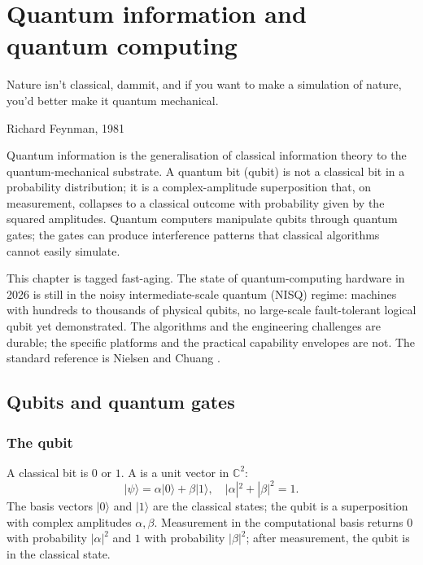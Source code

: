 \chapter{Quantum information and quantum computing}
\label{vol07:ch14}

\epigraph{Nature isn't classical, dammit, and if you want to make a simulation of nature, you'd better make it quantum mechanical.}{Richard Feynman, 1981}


\noindent
Quantum information is the generalisation of classical information theory to the quantum-mechanical substrate. A quantum bit (qubit) is not a classical bit in a probability distribution; it is a complex-amplitude superposition that, on measurement, collapses to a classical outcome with probability given by the squared amplitudes. Quantum computers manipulate qubits through quantum gates; the gates can produce interference patterns that classical algorithms cannot easily simulate.

This chapter is tagged fast-aging. The state of quantum-computing hardware in 2026 is still in the noisy intermediate-scale quantum (NISQ) regime: machines with hundreds to thousands of physical qubits, no large-scale fault-tolerant logical qubit yet demonstrated. The algorithms and the engineering challenges are durable; the specific platforms and the practical capability envelopes are not. The standard reference is Nielsen and Chuang \cite{text:nielsen-chuang}.

\section{Qubits and quantum gates}

\subsection{The qubit}

A classical bit is $0$ or $1$. A  is a unit vector in $\mathbb{C}^2$:
\[
|\psi\rangle = \alpha |0\rangle + \beta |1\rangle, \quad |\alpha|^2 + |\beta|^2 = 1.
\]
The basis vectors $|0\rangle$ and $|1\rangle$ are the classical states; the qubit is a superposition with complex amplitudes $\alpha, \beta$. Measurement in the computational basis returns $0$ with probability $|\alpha|^2$ and $1$ with probability $|\beta|^2$; after measurement, the qubit is in the classical state.

